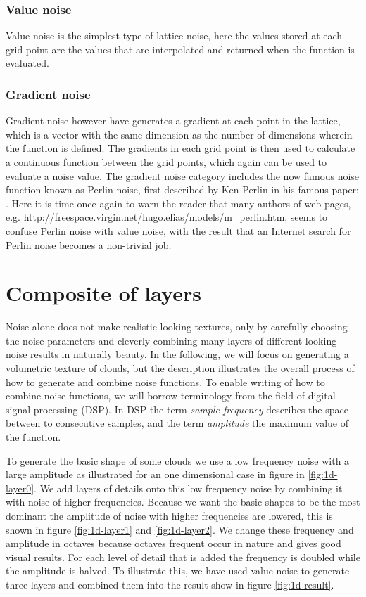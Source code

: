 \subsubsection{Value noise}
Value noise is the simplest type of lattice noise, here the values
stored at each grid point are the values that are interpolated and
returned when the function is evaluated.

\subsubsection{Gradient noise}
Gradient noise however have generates a gradient at each point in the
lattice, which is a vector with the same dimension as the number of
dimensions wherein the function is defined. The gradients in each grid
point is then used to calculate a continuous function between the grid
points, which again can be used to evaluate a noise value.
%
The gradient noise category includes the now famous noise
function known as Perlin noise, first described by Ken Perlin in
his famous paper: .
%
Here it is time once again to warn the reader that many authors of web
pages,
e.g. \url{http://freespace.virgin.net/hugo.elias/models/m_perlin.htm},
seems to confuse Perlin noise with value noise, with the result that
an Internet search for Perlin noise becomes a non-trivial job.

\section{Composite of layers}
Noise alone does not make realistic looking textures, only by carefully
choosing the noise parameters and cleverly combining many layers of
different looking noise results in naturally beauty. In the following,
we will focus on generating a volumetric texture of clouds, but the
description illustrates the overall process of how to generate and
combine noise functions.
%
To enable writing of how to combine noise functions, we will borrow
terminology from the field of digital signal processing (DSP).
In DSP the term \emph{sample frequency}
describes the space between to consecutive samples, and the term
\emph{amplitude} the maximum value of the function.

To generate the basic shape of some clouds we use a low
frequency noise with a large amplitude as illustrated for an one
dimensional case in figure in \ref{fig:1d-layer0}.
%
We add layers of details onto this low frequency noise by combining it 
with noise of higher frequencies.
Because we want the basic shapes to be the most
dominant the amplitude of noise with higher frequencies are lowered,
this is shown in figure \ref{fig:1d-layer1} and \ref{fig:1d-layer2}.
%
We change these frequency and amplitude in octaves because
octaves frequent occur in nature and gives good visual results.
For each level of detail that is added the frequency is doubled while
the amplitude is halved. To illustrate this, we have used value noise
to generate three layers and combined them into the result show in
figure \ref{fig:1d-result}.

